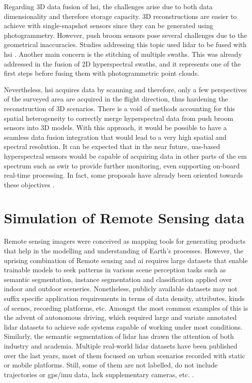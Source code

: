 Regarding 3D data fusion of \acrshort{hsi}, the challenges arise due to both data dimensionality and therefore storage capacity. 3D reconstructions are easier to achieve with single-snapshot sensors since they can be generated using photogrammetry. However, push broom sensors pose several challenges due to the geometrical inaccuracies. Studies addressing this topic used \acrshort{lidar} to be fused with \acrshort{hsi} \cite{lin_detection_2019, sankey_uav_2018}. Another main concern is the stitching of multiple swaths. This was already addressed in the fusion of 2D hyperspectral swaths, and it represents one of the first steps before fusing them with photogrammetric point clouds. 

Nevertheless, \acrshort{hsi} acquires data by scanning and therefore, only a few perspectives of the surveyed area are acquired in the flight direction, thus hardening the reconstruction of 3D scenarios. There is a void of methods accounting for this spatial heterogeneity to correctly merge hyperspectral data from push broom sensors into 3D models. With this approach, it would be possible to have a seamless data fusion integration that would lead to a very high spatial and spectral resolution. It can be expected that in the near future, \acrshort{uas}-based hyperspectral sensors would be capable of acquiring data in other parts of the \acrshort{em} spectrum such as \acrshort{swir} to provide further monitoring, even supporting on-board real-time processing. In fact, some proposals have already been oriented towards these objectives \cite{horstrand_uav_2019, saari_visible_2017}.

\section{Simulation of Remote Sensing data}

Remote sensing imagers were conceived as mapping tools for generating products that help in the modelling and understanding of Earth's processes. However, the uprising combination of Remote sensing and \acrshort{ai} requires large datasets that enable trainable models to seek patterns in various scene perception tasks such as semantic segmentation, instance segmentation and classification applied over indoor and outdoor sceneries. Nonetheless, publicly available datasets may not suffix specific application requirements in terms of data density, attributes, kinds of scenes, recording platforms, etc. Amongst the most common examples of this is the advent of autonomous driving, which required large and variate annotated \acrshort{lidar} datasets to achieve safe systems capable of working under most conditions. Similarly, the semantic segmentation of \acrshort{lidar} has drawn the attention of both industry and academia. Multiple real-world \acrshort{lidar} datasets have been published over the last years, most of them focused on urban scenarios recorded with static or mobile platforms. Still, some of them are not labelled, do not include trajectories or \acrshort{gps}/\acrshort{imu} data, lack supplementary cameras, etc. \cite{cai_survey_2022}. 

